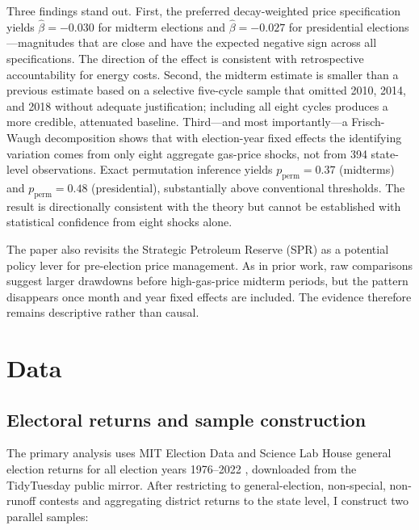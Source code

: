 \documentclass[12pt]{article}
\begin{document}
Three findings stand out. First, the preferred decay-weighted price specification yields $\hat\beta=-0.030$ for midterm elections and $\hat\beta=-0.027$ for presidential elections---magnitudes that are close and have the expected negative sign across all specifications. The direction of the effect is consistent with retrospective accountability for energy costs. Second, the midterm estimate is smaller than a previous estimate based on a selective five-cycle sample that omitted 2010, 2014, and 2018 without adequate justification; including all eight cycles produces a more credible, attenuated baseline. Third---and most importantly---a Frisch-Waugh decomposition shows that with election-year fixed effects the identifying variation comes from only eight aggregate gas-price shocks, not from 394 state-level observations. Exact permutation inference yields $p_{\text{perm}}=0.37$ (midterms) and $p_{\text{perm}}=0.48$ (presidential), substantially above conventional thresholds. The result is directionally consistent with the theory but cannot be established with statistical confidence from eight shocks alone.

The paper also revisits the Strategic Petroleum Reserve (SPR) as a potential policy lever for pre-election price management. As in prior work, raw comparisons suggest larger drawdowns before high-gas-price midterm periods, but the pattern disappears once month and year fixed effects are included. The evidence therefore remains descriptive rather than causal.

\section{Data}
\label{sec:data}

\subsection{Electoral returns and sample construction}

The primary analysis uses MIT Election Data and Science Lab House general election returns for all election years 1976--2022 \citep{MEDSL2023}, downloaded from the TidyTuesday public mirror. After restricting to general-election, non-special, non-runoff contests and aggregating district returns to the state level, I construct two parallel samples:
\end{document}
